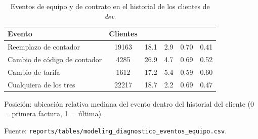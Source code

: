\begin{table}[htbp]
  \centering
  \small
  \caption{Eventos de equipo y de contrato en el historial de los clientes de \textit{dev}.}
  \label{tab:eventos}
  \begin{threeparttable}
    \begin{tabular}{l S[table-format=5.0] S[table-format=2.1] S[table-format=1.1] S[table-format=1.2] S[table-format=1.2]}
      \toprule
      {Evento} & {Clientes} & {} & {} & {} & {} \\
      \midrule
      Reemplazo de contador & 19163 & 18.1 & 2.9 & 0.70 & 0.41 \\
      Cambio de código de contador & 4285 & 26.9 & 4.7 & 0.69 & 0.52 \\
      Cambio de tarifa & 1612 & 17.2 & 5.4 & 0.59 & 0.60 \\
      Cualquiera de los tres & 22217 & 18.7 & 2.2 & 0.69 & 0.47 \\
      \bottomrule
    \end{tabular}
    \begin{tablenotes}
      \footnotesize
      \item Posición: ubicación relativa mediana del evento dentro del historial del cliente (0 = primera factura, 1 = última).
      \item Fuente: \texttt{reports/tables/modeling\_diagnostico\_eventos\_equipo.csv}.
    \end{tablenotes}
  \end{threeparttable}
\end{table}
